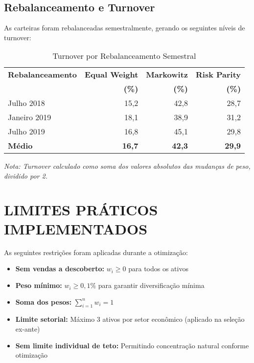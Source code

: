 \subsection{Rebalanceamento e Turnover}

As carteiras foram rebalanceadas semestralmente, gerando os seguintes níveis de turnover:

\begin{table}[H]
\centering
\caption{Turnover por Rebalanceamento Semestral}
\begin{tabular}{|l|r|r|r|}
\hline
\textbf{Rebalanceamento} & \textbf{Equal Weight} & \textbf{Markowitz} & \textbf{Risk Parity} \\
& \textbf{(\%)} & \textbf{(\%)} & \textbf{(\%)} \\
\hline
Julho 2018 & 15,2 & 42,8 & 28,7 \\
\hline
Janeiro 2019 & 18,1 & 38,9 & 31,2 \\
\hline
Julho 2019 & 16,8 & 45,1 & 29,8 \\
\hline
\textbf{Médio} & \textbf{16,7} & \textbf{42,3} & \textbf{29,9} \\
\hline
\end{tabular}

\textit{Nota: Turnover calculado como soma dos valores absolutos das mudanças de peso, dividido por 2.}
\label{tab:turnover_rebalanceamento}
\end{table}

\section{LIMITES PRÁTICOS IMPLEMENTADOS}

As seguintes restrições foram aplicadas durante a otimização:

\begin{itemize}
    \item \textbf{Sem vendas a descoberto:} $w_i \geq 0$ para todos os ativos
    \item \textbf{Peso mínimo:} $w_i \geq 0,1\%$ para garantir diversificação mínima
    \item \textbf{Soma dos pesos:} $\sum_{i=1}^{n} w_i = 1$
    \item \textbf{Limite setorial:} Máximo 3 ativos por setor econômico (aplicado na seleção ex-ante)
    \item \textbf{Sem limite individual de teto:} Permitindo concentração natural conforme otimização
\end{itemize}

